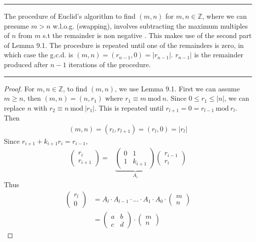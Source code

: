 \documentclass{article}
\theoremstyle{definition}
\theoremstyle{remark}
\begin{document}
\hrule
\vspace{2mm}
The procedure of Euclid's algorithm to find $(m,n)$ for $m,n\in\mathbb{Z}$, where we can presume $m>n$ w.l.o.g. (swapping), involves subtracting the maximum multiples of $n$ from $m$ s.t the remainder is non negative . This makes use of the second part of Lemma 9.1. The procedure is repeated until one of the remainders is zero, in which case the g.c.d. is $(m,n)=(r_{n-1},0)=|r_{n-1}|$. $r_{n-1}|$ is the remainder produced after $n-1$ iterations of the procedure.\\
\hrule
\begin{proof}
	For $m,n\in\mathbb{Z}$, to find $(m,n)$, we use Lemma 9.1. First we can assume $m\geq n$, then $(m,n)=(n,r_1)$ where $r_1\equiv m~\mathrm{mod}~n$. Since $0\leq r_1\leq |n|$, we can replace $n$ with $r_2\equiv n~\mathrm{mod}~|r_1|$. This is repeated until $r_{l+1}=0=r_{l-1}~\mathrm{mod}~r_l$. Then
	\begin{align*}
		(m,n)=(r_l,r_{l+1})=(r_l,0)=|r_l|
	\end{align*}
	Since $r_{i+1}+k_{i+1}r_i=r_{i-1}$,
	\begin{align*}
		\begin{pmatrix}
			r_i \\
			r_{i+1}
		\end{pmatrix}
		=
		 & \underbrace{\begin{pmatrix}
				               0 & 1       \\
				               1 & k_{i+1}
			               \end{pmatrix}}_{A_i}
		\begin{pmatrix}
			r_{i-1} \\
			r_i
		\end{pmatrix}
	\end{align*}
	Thus
	\begin{align*}
		\begin{pmatrix}
			r_l \\0
		\end{pmatrix}
		 & =A_l\cdot A_{l-1}\cdot...\cdot A_1\cdot A_0\cdot\begin{pmatrix}
			                                                   m \\n
		                                                   \end{pmatrix} \\
		 & =\begin{pmatrix}
			    a & b \\
			    c & d
		    \end{pmatrix}
		\cdot \begin{pmatrix}
			      m \\n
		      \end{pmatrix}
	\end{align*}
\end{proof}
\newpage
\end{document}
